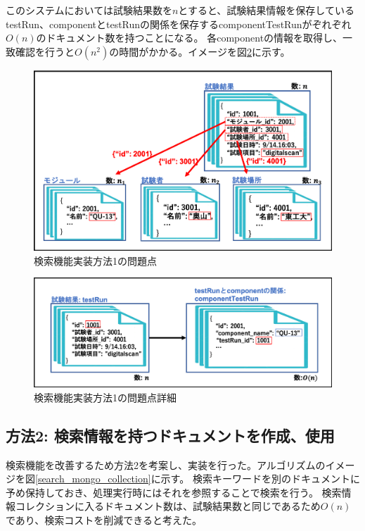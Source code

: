 このシステムにおいては試験結果数を$n$とすると、試験結果情報を保存しているtestRun、componentとtestRunの関係を保存するcomponentTestRunがぞれぞれ$O(n)$のドキュメント数を持つことになる。
各componentの情報を取得し、一致確認を行うと$O(n^2)$の時間がかかる。イメージを図\ref{search_python_testRun}に示す。


\begin{figure}[bpt]
  \begin{center}
    \includegraphics[width=14cm]{search_python_list_problem}
  \caption[検索機能実装方法1の問題点]{検索機能実装方法1の問題点}
  \label{search_python_list_problem}
  \end{center}
\end{figure}

\begin{figure}[bpt]
  \begin{center}
    \includegraphics[width=14cm]{search_python_testRun}
  \caption[検索機能実装方法1の問題点詳細]{検索機能実装方法1の問題点詳細}
  \label{search_python_testRun}
  \end{center}
\end{figure}

\subsection{方法2: 検索情報を持つドキュメントを作成、使用}
検索機能を改善するため方法2を考案し、実装を行った。アルゴリズムのイメージを図\ref{search_mongo_collection}に示す。
検索キーワードを別のドキュメントに予め保持しておき、処理実行時にはそれを参照することで検索を行う。
検索情報コレクションに入るドキュメント数は、試験結果数と同じであるため$O(n)$であり、検索コストを削減できると考えた。

